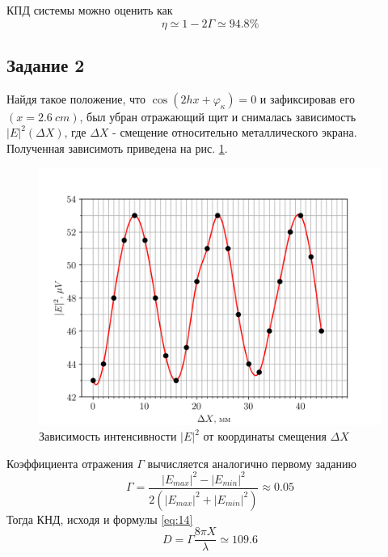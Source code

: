 КПД системы можно оценить как 
\begin{equation}
    \eta \simeq 1-2\Gamma \simeq 94.8\%     
\end{equation}
\subsection{Задание 2}
Найдя такое положение, что $\cos (2 h x +\varphi_{\kappa} )=0$ и зафиксировав его $(x = 2.6~cm)$, был убран отражающий щит и снималась
зависимость $|E|^2(\Delta X)$, где $\Delta X$ - смещение относительно металлического экрана. Полученная зависимоть
приведена на рис. \ref{fig:exp:2}.
\begin{figure}[h!]
    \centering
    \includegraphics[width = 0.9\linewidth]{graphs/data222.png}
    \caption{Зависимость интенсивности $|E|^2$ от координаты смещения $\Delta X$}
    \label{fig:exp:2}
\end{figure}

Коэффициента отражения $\Gamma$ вычисляется аналогично первому заданию
\begin{equation}
    \Gamma = \frac{|E_{max}|^2-|E_{min}|^2}{2( |E_{max}|^2+|E_{min}|^2 )} \approx 0.05
\end{equation}
Тогда КНД, исходя и формулы \eqref{eq:14}
\begin{equation}
    D = \Gamma \frac{8 \pi X}{\lambda} \simeq 109.6    
\end{equation}


